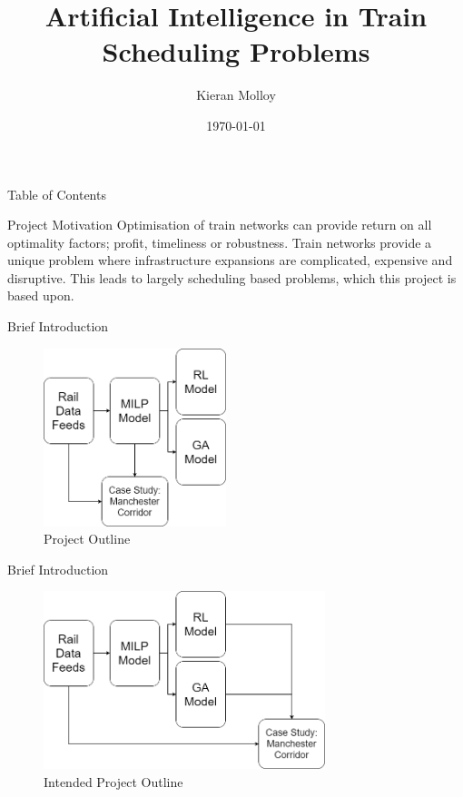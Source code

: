 \documentclass[aspectratio=169]{beamer}
\title{Artificial Intelligence in Train Scheduling Problems}
\author{
    Kieran Molloy
}
\institute{Manchester Metropolitan University}
\date{\today}
\begin{document}
\maketitle

\begin{frame}{Table of Contents}
    \tableofcontents
\end{frame}

\begin{frame}{Project Motivation}
    Optimisation of train networks can provide return on all optimality factors; profit, timeliness or robustness. Train networks provide a unique problem where infrastructure expansions are complicated, expensive and disruptive. This leads to largely scheduling based problems, which this project is based upon.
\end{frame}

\begin{frame}{Brief Introduction}
    \begin{figure}
        \centering
        \includegraphics[height=14em]{assets/Introduction/project-outline.png}
        \caption{Project Outline}
        \label{fig:project-outline}
    \end{figure}
\end{frame}

\begin{frame}{Brief Introduction}
    \begin{figure}
        \centering
        \includegraphics[height=14em]{assets/Introduction/desired-project-outline.png}
        \caption{Intended Project Outline}
        \label{fig:i-project-outline}
    \end{figure}
\end{frame}
\end{document}

